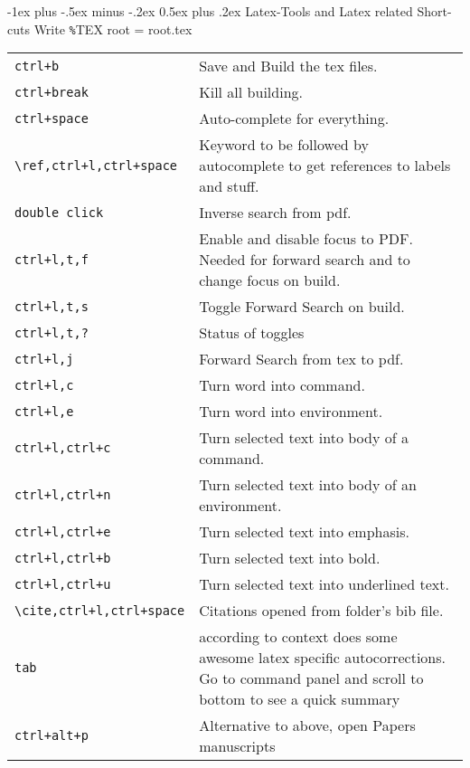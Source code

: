 \documentclass[12pt,landscape]{article}
\makeatletter
\renewcommand{\section}{\@startsection{section}{1}{0mm}%
                                {-1ex plus -.5ex minus -.2ex}%
                                {0.5ex plus .2ex}%
                                {\normalfont\large\bfseries}}
\makeatother
\begin{document}
\begin{multicols}{2}
\section{Latex-Tools and Latex related Short-cuts}
\label{Latex}
Write \verb!%!TEX root = root.tex
\begin{tabular}{p{3in}  p{6in}}
\verb!ctrl+b!           & Save and Build the tex files. \\
\verb!ctrl+break!       & Kill all building. \\
\verb!ctrl+space!       & Auto-complete for everything. \\
\verb!\ref,ctrl+l,ctrl+space! & Keyword to be followed by autocomplete to get references to labels and stuff. \\
\verb!double click!  & Inverse search from pdf. \\
\verb!ctrl+l,t,f!       & Enable and disable focus to PDF. Needed for forward search and to change focus on build. \\
\verb!ctrl+l,t,s!      & Toggle Forward Search on build. \\
\verb!ctrl+l,t,?!      & Status of toggles \\
\verb!ctrl+l,j!      & Forward Search from tex to pdf. \\
\verb!ctrl+l,c!      & Turn word into command. \\
\verb!ctrl+l,e!      & Turn word into environment. \\
\verb!ctrl+l,ctrl+c!    & Turn selected text into body of a command. \\
\verb!ctrl+l,ctrl+n!    & Turn selected text into body of an environment. \\
\verb!ctrl+l,ctrl+e!    & Turn selected text into emphasis. \\
\verb!ctrl+l,ctrl+b!    & Turn selected text into bold. \\
\verb!ctrl+l,ctrl+u!    & Turn selected text into underlined text. \\
\verb!\cite,ctrl+l,ctrl+space! & Citations opened from folder's bib file. \\ 
\verb!tab!          & according to context does some awesome latex specific autocorrections. Go to command panel and scroll to bottom to see a quick summary\\
\verb!ctrl+alt+p!        & Alternative to above, open Papers manuscripts
\end{tabular}
\end{multicols}
\newpage
\end{document}
